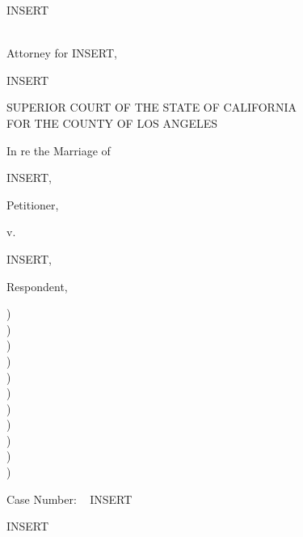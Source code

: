\documentclass{article}
\newcommand{\tab}{\hspace*{.5in}}
\newenvironment{tightcenter}{%
	\setlength\topsep{0pt}
	\setlength\parskip{0pt}
		\begin{center}
		}{%
		\end{center}
		}
\begin{document}
\begin{singlespace*}

INSERT

~\\

Attorney for INSERT,

INSERT

\end{singlespace*}

\vspace*{18mm}

\begin{tightcenter}
SUPERIOR COURT OF THE STATE OF CALIFORNIA \\ FOR THE COUNTY OF LOS ANGELES
\end{tightcenter}

\vspace*{16.25mm}

	{
\begin{minipage}[t]{3in}

In re the Marriage of

INSERT,

\tab \tab \tab Petitioner,

\tab \tab v.

INSERT,

\tab \tab \tab Respondent,

\makebox[3in]{\hrulefill}

\end{minipage}
	\begin{minipage}[t]{5mm}
		\begin{singlespace*}
			)\\)\\)\\)\\)\\)\\)\\)\\)\\)\\)
		\end{singlespace*}
	\end{minipage}
\begin{minipage}[t]{3in}

Case Number: ~ INSERT

INSERT


\end{minipage}
	}

\vspace{5mm}
\end{document}
